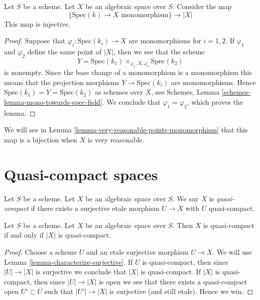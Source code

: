 \begin{lemma}
\label{lemma-points-monomorphism}
Let $S$ be a scheme. Let $X$ be an algebraic space over $S$.
Consider the map
$$
\{\text{Spec}(k) \to X \text{ monomorphism}\}
\longrightarrow
|X|
$$
This map is injective.
\end{lemma}

\begin{proof}
Suppose that $\varphi_i : \text{Spec}(k_i) \to X$ are monomorphisms
for $i = 1, 2$. If $\varphi_1$ and $\varphi_2$ define the same point
of $|X|$, then we see that the scheme
$$
Y = \text{Spec}(k_1) \times_{\varphi_1, X, \varphi_2} \text{Spec}(k_2)
$$
is nonempty. Since the base change of a monomorphism is a monomorphism
this means that the projection morphisms $Y \to \text{Spec}(k_i)$
are monomorphisms. Hence $\text{Spec}(k_1) = Y = \text{Spec}(k_2)$
as schemes over $X$, see
Schemes, Lemma \ref{schemes-lemma-mono-towards-spec-field}.
We conclude that $\varphi_1 = \varphi_2$, which proves the lemma.
\end{proof}

\noindent
We will see in
Lemma \ref{lemma-very-reasonable-points-monomorphism}
that this map is a bijection when $X$ is very reasonable.

















\section{Quasi-compact spaces}
\label{section-quasi-compact}

\begin{definition}
\label{definition-quasi-compact}
Let $S$ be a scheme.
Let $X$ be an algebraic space over $S$.
We say $X$ is {\it quasi-compact} if there exists a surjective
etale morphism $U \to X$ with $U$ quasi-compact.
\end{definition}

\begin{lemma}
\label{lemma-quasi-compact-space}
Let $S$ be a scheme.
Let $X$ be an algebraic space over $S$.
Then $X$ is quasi-compact if and only if $|X|$ is quasi-compact.
\end{lemma}

\begin{proof}
Choose a scheme $U$ and an etale surjective morphism $U \to X$.
We will use Lemma \ref{lemma-characterize-surjective}.
If $U$ is quasi-compact, then since $|U| \to |X|$ is surjective
we conclude that $|X|$ is quasi-compact.
If $|X|$ is quasi-compact, then since $|U| \to |X|$ is open
we see that there exists a quasi-compact open $U' \subset U$
such that $|U'| \to |X|$ is surjective (and still etale).
Hence we win.
\end{proof}

